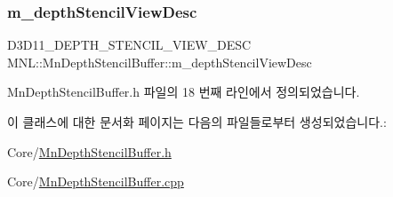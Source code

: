 \subsubsection{\texorpdfstring{m\+\_\+depth\+Stencil\+View\+Desc}{m\_depthStencilViewDesc}}
{\footnotesize\ttfamily D3\+D11\+\_\+\+D\+E\+P\+T\+H\+\_\+\+S\+T\+E\+N\+C\+I\+L\+\_\+\+V\+I\+E\+W\+\_\+\+D\+E\+SC M\+N\+L\+::\+Mn\+Depth\+Stencil\+Buffer\+::m\+\_\+depth\+Stencil\+View\+Desc\hspace{0.3cm}{\ttfamily [private]}}



Mn\+Depth\+Stencil\+Buffer.\+h 파일의 18 번째 라인에서 정의되었습니다.



이 클래스에 대한 문서화 페이지는 다음의 파일들로부터 생성되었습니다.\+:\begin{DoxyCompactItemize}
\item 
Core/\hyperlink{_mn_depth_stencil_buffer_8h}{Mn\+Depth\+Stencil\+Buffer.\+h}\item 
Core/\hyperlink{_mn_depth_stencil_buffer_8cpp}{Mn\+Depth\+Stencil\+Buffer.\+cpp}\end{DoxyCompactItemize}

